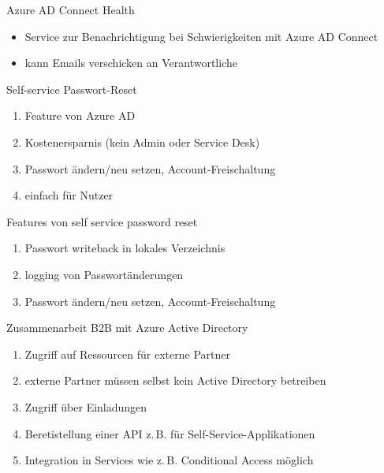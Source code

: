 \begin{flashcard}[Definition]{Azure AD Connect Health}
  \begin{itemize}
    \item Service zur Benachrichtigung bei Schwierigkeiten mit Azure AD Connect
    \item kann Emails verschicken an Verantwortliche
  \end{itemize}
\end{flashcard}


\begin{flashcard}[Definition]{Self-service Passwort-Reset}
  \begin{enumerate}
    \item Feature von Azure AD
    \item Kostenersparnis (kein Admin oder Service Desk)
    \item Passwort ändern/neu setzen, Account-Freischaltung
    \item einfach für Nutzer
  \end{enumerate}
\end{flashcard}

\begin{flashcard}[Definition]{Features von self service password reset}
  \begin{enumerate}
    \item Passwort writeback in lokales Verzeichnis
    \item logging von Passwortänderungen
    \item Passwort ändern/neu setzen, Account-Freischaltung
  \end{enumerate}
\end{flashcard}


\begin{flashcard}[Definition]{Zusammenarbeit B2B mit Azure Active Directory}
  \begin{enumerate}
    \item Zugriff auf Ressourcen für externe Partner
    \item externe Partner müssen selbst kein Active Directory betreiben
    \item Zugriff über Einladungen
    \item Beretistellung einer API z.\,B. für Self-Service-Applikationen
    \item Integration in Services wie z.\,B. Conditional Access möglich
  \end{enumerate}
\end{flashcard}

